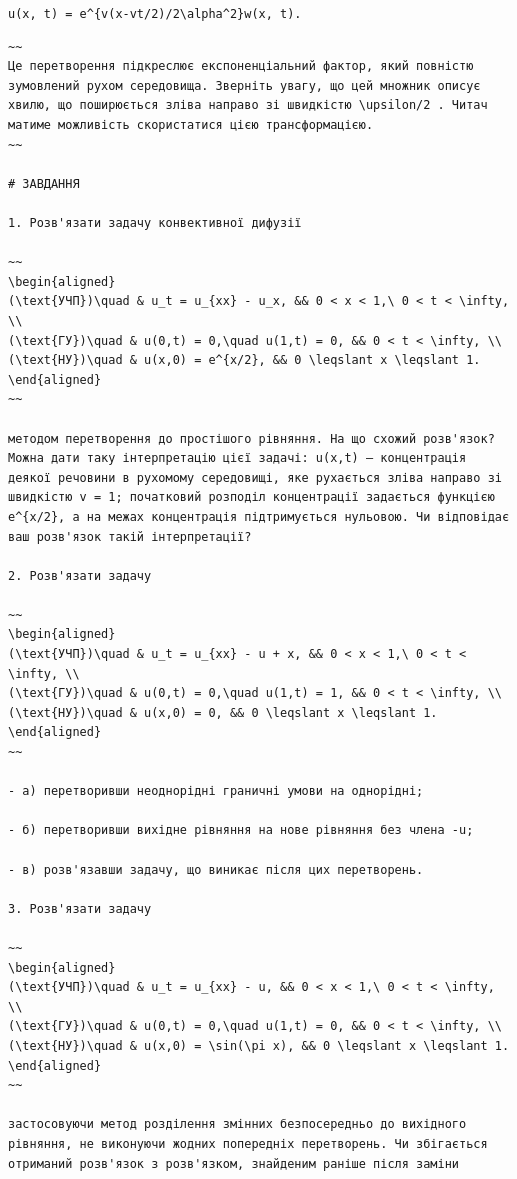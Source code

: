 \documentclass[
  ukrainian,
]{article}
\begin{document}
\texttt{u(x,\ t)\ =\ e\^{}\{v(x-vt/2)/2\textbackslash{}alpha\^{}2\}w(x,\ t).}

\begin{verbatim}
~~
Це перетворення підкреслює експоненціальний фактор, який повністю зумовлений рухом середовища. Зверніть увагу, що цей множник описує хвилю, що поширюється зліва направо зі швидкістю \upsilon/2 . Читач матиме можливість скористатися цією трансформацією.
~~

# ЗАВДАННЯ

1. Розв'язати задачу конвективної дифузії

~~
\begin{aligned}
(\text{УЧП})\quad & u_t = u_{xx} - u_x, && 0 < x < 1,\ 0 < t < \infty, \\
(\text{ГУ})\quad & u(0,t) = 0,\quad u(1,t) = 0, && 0 < t < \infty, \\
(\text{НУ})\quad & u(x,0) = e^{x/2}, && 0 \leqslant x \leqslant 1.
\end{aligned}
~~

методом перетворення до простішого рівняння. На що схожий розв'язок? Можна дати таку інтерпретацію цієї задачі: u(x,t) — концентрація деякої речовини в рухомому середовищі, яке рухається зліва направо зі швидкістю v = 1; початковий розподіл концентрації задається функцією e^{x/2}, а на межах концентрація підтримується нульовою. Чи відповідає ваш розв'язок такій інтерпретації?

2. Розв'язати задачу

~~
\begin{aligned}
(\text{УЧП})\quad & u_t = u_{xx} - u + x, && 0 < x < 1,\ 0 < t < \infty, \\
(\text{ГУ})\quad & u(0,t) = 0,\quad u(1,t) = 1, && 0 < t < \infty, \\
(\text{НУ})\quad & u(x,0) = 0, && 0 \leqslant x \leqslant 1.
\end{aligned}
~~

- а) перетворивши неоднорідні граничні умови на однорідні;

- б) перетворивши вихідне рівняння на нове рівняння без члена -u;

- в) розв'язавши задачу, що виникає після цих перетворень.

3. Розв'язати задачу

~~
\begin{aligned}
(\text{УЧП})\quad & u_t = u_{xx} - u, && 0 < x < 1,\ 0 < t < \infty, \\
(\text{ГУ})\quad & u(0,t) = 0,\quad u(1,t) = 0, && 0 < t < \infty, \\
(\text{НУ})\quad & u(x,0) = \sin(\pi x), && 0 \leqslant x \leqslant 1.
\end{aligned}
~~

застосовуючи метод розділення змінних безпосередньо до вихідного рівняння, не виконуючи жодних попередніх перетворень. Чи збігається отриманий розв'язок з розв'язком, знайденим раніше після заміни
\end{verbatim}
\end{document}
